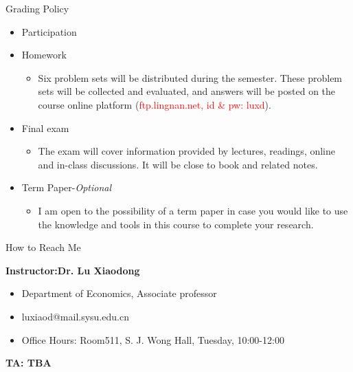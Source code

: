 \documentclass[10pt,hyperref={CJKbookmarks=true},xcolor=dvipsnames,aspectratio=43]{beamer}
\begin{document}
\begin{frame}{Grading Policy}

\begin{itemize}
\item Participation \structure{\textcolor{red}{10\%}}
\item Homework \structure{\textcolor{red}{20\%}}

\begin{itemize}
\item Six problem sets will be distributed during the semester. These problem
sets will be collected and evaluated, and answers will be posted on
the course online platform (\textcolor{red}{ftp.lingnan.net, id \&
pw: luxd}).
\end{itemize}
\item Final exam \structure{\textcolor{red}{70\%}}

\begin{itemize}
\item The exam will cover information provided by lectures, readings, online
and in-class discussions. It will be close to book and related notes. 
\end{itemize}
\item Term Paper-\emph{Optional}

\begin{itemize}
\item I am open to the possibility of a term paper in case you would like
to use the knowledge and tools in this course to complete your research.
\end{itemize}
\end{itemize}
\end{frame}

\begin{frame}{How to Reach Me}


\textbf{Instructor:Dr. Lu Xiaodong}
\begin{itemize}
\item Department of Economics, Associate professor
\item luxiaod@mail.sysu.edu.cn 
\item Office Hours: Room511, S. J. Wong Hall, Tuesday, 10:00-12:00
\end{itemize}


\textbf{TA: TBA}
\end{frame}
\end{document}
